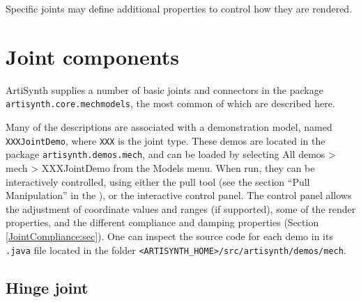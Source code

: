 Specific joints may define additional properties to control how they
are rendered.

\section{Joint components}
\label{JointTypes:sec}

ArtiSynth supplies a number of basic joints and connectors in the package {\tt
artisynth.core.mechmodels}, the most common of which are described
here. 

Many of the descriptions are associated with a demonstration model,
named {\tt XXXJointDemo}, where {\tt XXX} is the joint type.  These
demos are located in the package {\tt artisynth.demos.mech}, and can
be loaded by selecting {\sf All demos > mech > XXXJointDemo} from the
{\sf Models} menu. When run, they can be interactively controlled,
using either the pull tool (see the section ``Pull Manipulation'' in
the ), or the
interactive control panel. The control panel allows the adjustment of
coordinate values and ranges (if supported), some of the render
properties, and the different {\sf compliance} and {\sf damping}
properties (Section \ref{JointCompliance:sec}).  One can inspect the
source code for each demo in its {\tt .java} file located in the
folder {\tt <ARTISYNTH\_HOME>/src/artisynth/demos/mech}.

\subsection{Hinge joint}
\label{HingeJoint:sec}

